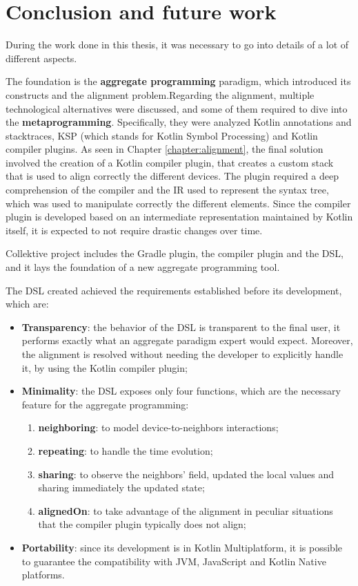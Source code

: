 \chapter{Conclusion and future work}\label{chapter:conclusion}
During the work done in this thesis, it was necessary to go into details of a lot of different aspects.

The foundation is the \textbf{aggregate programming} paradigm, which introduced its constructs and the alignment problem.\newline Regarding the alignment, multiple technological alternatives were discussed, and some of them required to dive into the \textbf{metaprogramming}. Specifically, they were analyzed Kotlin annotations and stacktraces, KSP (which stands for Kotlin Symbol Processing) and Kotlin compiler plugins.\newline
As seen in Chapter \ref{chapter:alignment}, the final solution involved the creation of a Kotlin compiler plugin, that creates a custom stack that is used to align correctly the different devices. The plugin required a deep comprehension of the compiler and the IR used to represent the syntax tree, which was used to manipulate correctly the different elements.\newline
Since the compiler plugin is developed based on an intermediate representation maintained by Kotlin itself, it is expected to not require drastic changes over time.

Collektive project includes the Gradle plugin, the compiler plugin and the DSL, and it lays the foundation of a new aggregate programming tool.

The DSL created achieved the requirements established before its development, which are:
\begin{itemize}
    \item \textbf{Transparency}: the behavior of the DSL is transparent to the final user, it performs exactly what an aggregate paradigm expert would expect. Moreover, the alignment is resolved without needing the developer to explicitly handle it, by using the Kotlin compiler plugin;
    \item \textbf{Minimality}: the DSL exposes only four functions, which are the necessary feature for the aggregate programming:
    \begin{enumerate}
        \item \textbf{neighboring}: to model device-to-neighbors interactions;
        \item \textbf{repeating}: to handle the time evolution;
        \item \textbf{sharing}: to observe the neighbors' field, updated the local values and sharing immediately the updated state;
        \item \textbf{alignedOn}: to take advantage of the alignment in peculiar situations that the compiler plugin typically does not align;
    \end{enumerate}
    \item \textbf{Portability}: since its development is in Kotlin Multiplatform, it is possible to guarantee the compatibility with JVM, JavaScript and Kotlin Native platforms.
\end{itemize}

